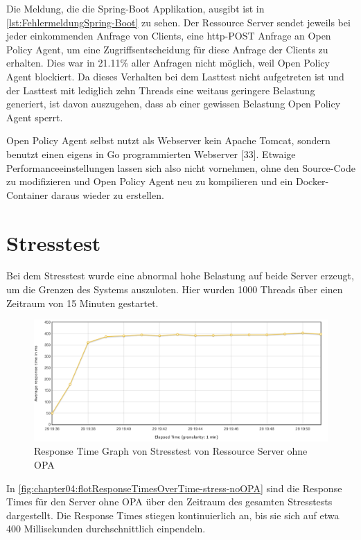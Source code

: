 Die Meldung, die die Spring-Boot Applikation, ausgibt ist in \autoref{lst:FehlermeldungSpring-Boot} zu sehen. Der Ressource Server sendet jeweils bei jeder einkommenden Anfrage von Clients, eine http-POST Anfrage an Open Policy Agent, um eine Zugriffsentscheidung für diese Anfrage der Clients zu erhalten. Dies war in 21.11\% aller Anfragen nicht möglich, weil Open Policy Agent blockiert. Da dieses Verhalten bei dem Lasttest nicht aufgetreten ist und der Lasttest mit lediglich zehn Threads eine weitaus geringere Belastung generiert, ist davon auszugehen, dass ab einer gewissen Belastung Open Policy Agent sperrt.\smallskip

Open Policy Agent selbst nutzt als Webserver kein Apache Tomcat, sondern benutzt einen eigens in Go programmierten Webserver [33]. Etwaige Performanceeinstellungen lassen sich also nicht vornehmen, ohne den Source-Code zu modifizieren und Open Policy Agent neu zu kompilieren und ein Docker-Container daraus wieder zu erstellen. 

\section{Stresstest}
Bei dem Stresstest wurde eine abnormal hohe Belastung auf beide Server erzeugt, um die Grenzen des Systems auszuloten. Hier wurden 1000 Threads über einen Zeitraum von 15 Minuten gestartet. 

\begin{figure}[htbp]
  \centering
  \includegraphics[width=1.0\textwidth]{gfx/flotResponseTimesOverTime-stress-noOPA.png}
  \caption{Response Time Graph von Stresstest von Ressource Server ohne OPA}
  \label{fig:chapter04:flotResponseTimesOverTime-stress-noOPA}
\end{figure}

In \autoref{fig:chapter04:flotResponseTimesOverTime-stress-noOPA} sind die Response Times für den Server ohne OPA über den Zeitraum des gesamten Stresstests dargestellt. Die Response Times stiegen kontinuierlich an, bis sie sich auf etwa 400 Millisekunden durchschnittlich einpendeln. 

